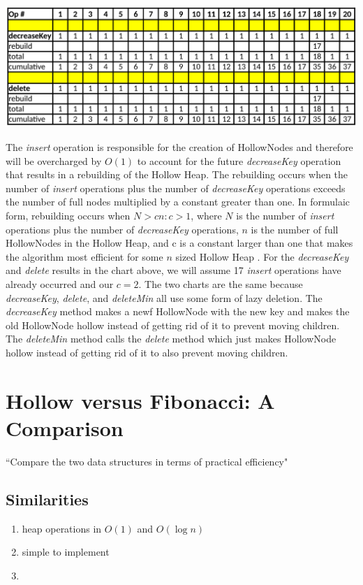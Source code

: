 \documentclass[letter,10pt]{article}
\begin{document}
\begin{center}
	\includegraphics[width=\textwidth]{accounting.png}
\end{center}
The \textit{insert} operation is responsible for the creation of HollowNodes and therefore will be overcharged by $O(1)$ to account for the future \textit{decreaseKey} operation that results in a rebuilding of the Hollow Heap. The rebuilding occurs when the number of \textit{insert} operations plus the number of \textit{decreaseKey} operations exceeds the number of full nodes multiplied by a constant greater than one. In formulaic form, rebuilding occurs when $N > cn: c > 1$, where $N$ is the number of \textit{insert} operations plus the number of \textit{decreaseKey} operations, $n$ is the number of full HollowNodes in the Hollow Heap, and c is a constant larger than one that makes the algorithm most efficient for some $n$ sized Hollow Heap \cite{hollow}. For the \textit{decreaseKey} and \textit{delete} results in the chart above, we will assume 17 \textit{insert} operations have already occurred and our $c = 2$. The two charts are the same because \textit{decreaseKey}, \textit{delete}, and \textit{deleteMin} all use some form of lazy deletion. The \textit{decreaseKey} method makes a newf HollowNode with the new key and makes the old HollowNode hollow instead of getting rid of it to prevent moving children. The \textit{deleteMin} method calls the \textit{delete} method which just makes HollowNode hollow instead of getting rid of it to also prevent moving children.

\section{Hollow versus Fibonacci: A Comparison}
``Compare the two data structures in terms of practical efficiency"
\subsection{Similarities}
\begin{enumerate}
    \item heap operations in $O(1)$ and $O(\log n)$
    \item simple to implement
    \item
\end{enumerate}
\end{document}
